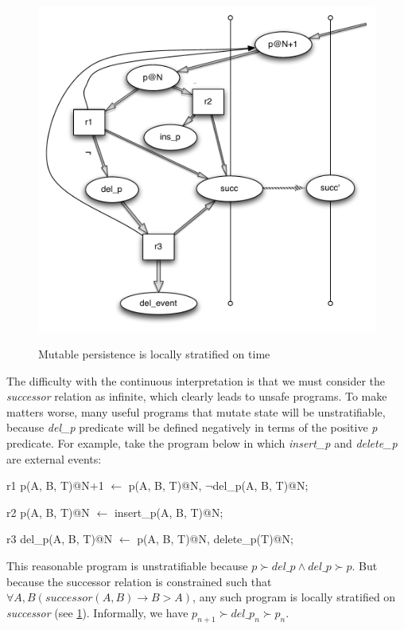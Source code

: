 \begin{figure}[t]
  \centering
  \includegraphics[width=0.75\linewidth]{localstrat_rgg.pdf}
  \label{fig:lstrat}
  \caption{Mutable persistence is locally stratified on time}
\vspace{-8pt}
\end{figure}


The difficulty with the continuous interpretation is that we must consider the \emph{successor} relation as infinite, which clearly leads
to unsafe programs.  To make matters worse, many useful programs that mutate state will be unstratifiable, because \emph{del\_p} predicate
will be defined negatively in terms of the positive \emph{p} predicate.  For example, take the program below in which \emph{insert\_p}
and \emph{delete\_p} are external events:

\begin{Dedalus}
r1
p(A, B, T)@N+1 \(\leftarrow\)
  p(A, B, T)@N,
  \(\lnot\)del\_p(A, B, T)@N;
  
r2
p(A, B, T)@N \(\leftarrow\)
  insert\_p(A, B, T)@N;

r3  
del_p(A, B, T)@N \(\leftarrow\)
  p(A, B, T)@N,
  delete\_p(T)@N;
\end{Dedalus}

This reasonable program is unstratifiable because $p \succ del\_p \land del\_p \succ p$.  But because the successor relation is constrained
such that $\forall A,B (successor(A, B) \rightarrow B > A)$, any such program is locally stratified on \emph{successor} (see \ref{fig:lstrat}).  Informally,
we have $p_{n+1} \succ del\_p_{n} \succ p_{n}$.


